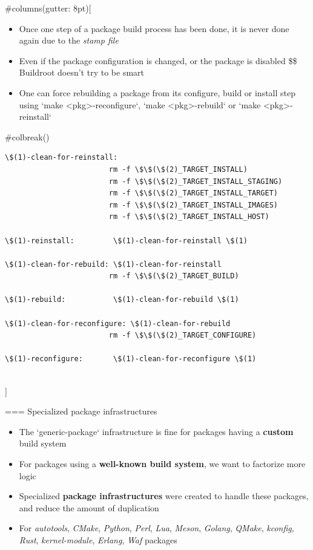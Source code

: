 #columns(gutter: 8pt)[
  \begin{itemize}
  \item Once one step of a package build process has been done, it is
    never done again due to the {\em stamp file}
  \item Even if the package configuration is changed, or the package
    is disabled \$\rightarrow\$ Buildroot doesn't try to be smart
  \item One can force rebuilding a package from its configure, build
    or install step using `make <pkg>-reconfigure`,
    `make <pkg>-rebuild` or `make <pkg>-reinstall`
  \end{itemize}
     #colbreak()
  \begin{block}{}
\begin{verbatim}
\$(1)-clean-for-reinstall:
                        rm -f \$\$(\$(2)_TARGET_INSTALL)
                        rm -f \$\$(\$(2)_TARGET_INSTALL_STAGING)
                        rm -f \$\$(\$(2)_TARGET_INSTALL_TARGET)
                        rm -f \$\$(\$(2)_TARGET_INSTALL_IMAGES)
                        rm -f \$\$(\$(2)_TARGET_INSTALL_HOST)

\$(1)-reinstall:         \$(1)-clean-for-reinstall \$(1)

\$(1)-clean-for-rebuild: \$(1)-clean-for-reinstall
                        rm -f \$\$(\$(2)_TARGET_BUILD)

\$(1)-rebuild:           \$(1)-clean-for-rebuild \$(1)

\$(1)-clean-for-reconfigure: \$(1)-clean-for-rebuild
                        rm -f \$\$(\$(2)_TARGET_CONFIGURE)

\$(1)-reconfigure:       \$(1)-clean-for-reconfigure \$(1)
\end{verbatim}
  \end{block}
  \\]


=== {Specialized package infrastructures}
  \begin{itemize}
  \item The `generic-package` infrastructure is fine for packages
    having a {\bf custom} build system
  \item For packages using a {\bf well-known build system}, we want
    to factorize more logic
  \item Specialized {\bf package infrastructures} were created to
    handle these packages, and reduce the amount of duplication
  \item For {\em autotools}, {\em CMake}, {\em Python}, {\em Perl},
    {\em Lua}, {\em Meson}, {\em Golang}, {\em QMake}, {\em kconfig},
    {\em Rust}, {\em kernel-module}, {\em Erlang}, {\em Waf}
    packages
  \end{itemize}


